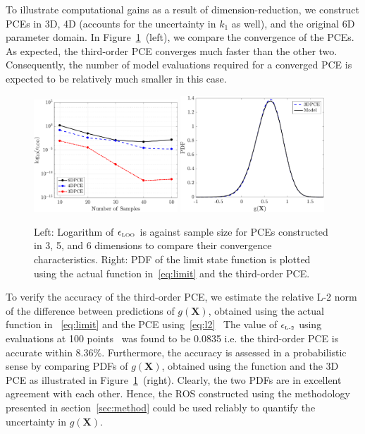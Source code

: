 To illustrate computational gains as a
result of dimension-reduction, we construct PCEs in 3D, 4D (accounts for the
uncertainty in $k_1$ as well), and the original 6D parameter domain. In
Figure~\ref{fig:conv_osc}~(left), we compare the convergence of the
PCEs. As expected, the third-order PCE converges much faster than the other
two. Consequently, the number of model evaluations required for a converged PCE
is expected to be relatively much smaller in this case.  
\begin{figure}[htbp]
 \begin{center}
  \includegraphics[width=0.48\textwidth]{./Figures/err_samples_oscillator}
  \includegraphics[width=0.48\textwidth]{./Figures/pdf_comp_oscillator}
\caption{Left: Logarithm of $\epsilon_{\mbox{\tiny{LOO}}}$ is against sample size for 
PCEs constructed in 3, 5, and 6 dimensions to compare their convergence characteristics. 
Right: PDF of the limit state function is plotted using the actual function in~\eqref{eq:limit}
and the third-order PCE.}
\label{fig:conv_osc}
\end{center}
\end{figure}

To verify the accuracy of the third-order PCE, we estimate the relative L-2
norm of the difference between predictions of  $g(\bm{X})$, obtained using the
actual function in ~\eqref{eq:limit} and the 
PCE using~\eqref{eq:l2}~  The
value of $\epsilon_{\mbox{\tiny{L-2}}}$ using evaluations 
at 100 points~
was
found to be 0.0835 i.e. the third-order PCE is accurate within 8.36$\%$.
Furthermore, the accuracy is assessed in a probabilistic sense by comparing
PDFs of $g(\bm{X})$, obtained using the function and the 3D PCE as illustrated
in Figure~\ref{fig:conv_osc}~(right).  Clearly, the two PDFs are in excellent
agreement with each other. Hence, the ROS constructed using the methodology
presented in section~\ref{sec:method} could be used reliably to 
quantify the uncertainty in $g(\bm{X})$.

